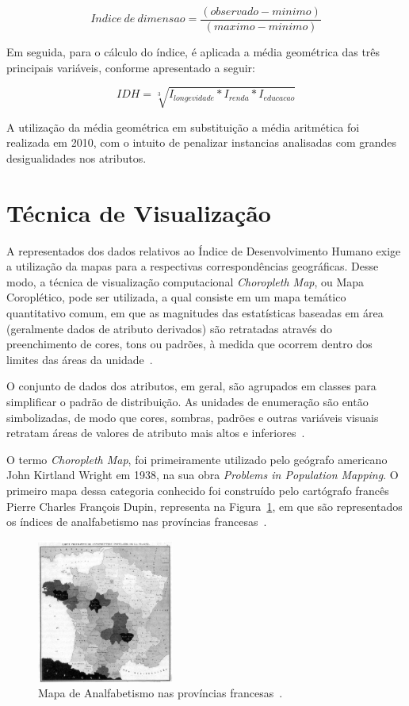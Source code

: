 \documentclass[conference]{IEEEtran}
\begin{document}
\[ Indice\: de \: dimensao = \frac{(observado - minimo)}{(maximo - minimo)} \] 

Em seguida, para o cálculo do índice, é aplicada a média geométrica  das três principais variáveis, conforme apresentado a seguir:

\[ IDH = \sqrt[3]{I_{longevidade}*I_{renda}*I_{educacao}} \]

A utilização da média geométrica em substituição a média aritmética foi realizada em 2010, com o intuito de penalizar instancias analisadas com grandes desigualidades nos atributos.

\section{Técnica de Visualização}
\label{section:tecnica}

A representados dos dados relativos ao Índice de Desenvolvimento Humano exige a utilização da mapas para a respectivas correspondências geográficas. Desse modo, a técnica de visualização computacional \textit{Choropleth Map}, ou Mapa Coroplético, pode ser utilizada, a qual consiste em um mapa temático quantitativo comum, em que as magnitudes das estatísticas baseadas em área (geralmente dados de atributo derivados) são retratadas através do preenchimento de cores, tons ou padrões, à medida que ocorrem dentro dos limites das áreas da unidade~\cite{torguson}. 

O conjunto de dados dos atributos, em geral, são agrupados em classes para simplificar o padrão de distribuição. As unidades de enumeração são então simbolizadas, de modo que cores, sombras, padrões e outras variáveis visuais retratam áreas de valores de atributo mais altos e inferiores~\cite{torguson}. 

O termo \textit{Choropleth Map}, foi primeiramente utilizado pelo geógrafo americano John Kirtland Wright em 1938, na sua obra \textit{Problems in Population Mapping}. O primeiro mapa dessa categoria conhecido foi construído pelo cartógrafo francês Pierre Charles François Dupin, representa na Figura~\ref{img:analfabetismo-franca}, em que são representados os índices de analfabetismo nas províncias francesas~\cite{mac}.

\begin{figure}[!ht]
\centering
\includegraphics[width=0.4\textwidth]{analfabetismo-franca.jpg}
\caption{Mapa de Analfabetismo nas províncias francesas~\cite{mac}.}
\label{img:analfabetismo-franca}
\end{figure}
\end{document}
